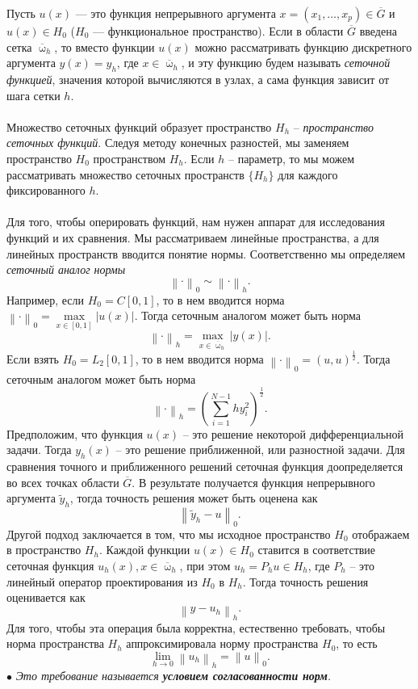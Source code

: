 \documentclass[a4paper, 12pt]{report}
\numberwithin{equation}{section}
\newcommand{\ol}{\overline}
\renewcommand{\omega}{\upomega}
\newcommand\Norm[1]{\left\| #1 \right\|}
\begin{document}
	Пусть $u(x)$ --- это функция непрерывного аргумента $x = (x_1, \ldots, x_p)\in \overline G$ и $u(x) \in H_0$ ($H_0$ --- функциональное пространство). Если в области $\overline G$ введена сетка $\overline \omega_h$, то вместо функции $u(x)$ можно рассматривать функцию дискретного аргумента $y(x) = y_h$, где $x\in \ol \omega _h$, и эту функцию будем называть \textit{сеточной функцией}, значения которой вычисляются в узлах, а сама функция зависит от шага сетки $h$.\\\\
	Множество сеточных функций образует пространство $H_h$ -- \textit{пространство сеточных функций}. Следуя методу конечных разностей, мы заменяем пространство $H_0$ пространством $H_h$. Если $h$ -- параметр, то мы можем рассматривать множество сеточных пространств $\{H_h\}$ для каждого фиксированного $h$.\\\\
	Для того, чтобы оперировать функций, нам нужен аппарат для исследования функций и их сравнения. Мы рассматриваем линейные пространства, а для линейных пространств вводится понятие нормы. Соответственно мы определяем \textit{сеточный аналог нормы} $$\Norm {\cdot}_0 \sim \Norm {\cdot} _h.$$
	Например, если $H_ 0 = C[0,1]$, то в нем вводится норма $\Norm {\cdot}_0 = \underset{x\in [0,1]} {\max}|u(x)|$. Тогда сеточным аналогом может быть норма $$\Norm {\cdot}_h = \underset{x \in \ol \omega_h}{\max}|y(x)|.$$
	Если взять $H_ 0 = L_2[0,1]$, то в нем вводится норма $\Norm {\cdot}_0 = (u,u)^\frac12$. Тогда сеточным аналогом может быть норма $$\Norm {\cdot}_h = \left(\sum_{i=1}^{N-1}hy_i^2\right)^\frac12.$$
	Предположим, что функция $u(x)$ -- это решение некоторой дифференциальной задачи. Тогда $y_h(x)$ -- это решение приближенной, или разностной задачи. Для сравнения точного и приближенного решений сеточная функция доопределяется во всех точках области $\ol G$. В результате получается функция непрерывного аргумента $\widetilde{y}_h$, тогда точность решения может быть оценена как $$\Norm{\widetilde{y}_h - u}_0.$$
	Другой подход заключается в том, что мы исходное пространство $H_0$ отображаем в пространство $H_h$. Каждой функции $u(x)\in H_0$ ставится в соответствие сеточная функция $u_h(x), x \in \ol \omega _h$, при этом $u_h = P_h u \in H_h$, где $P_h$ -- это линейный оператор проектирования из $H_0$ в $H_h$. Тогда точность решения оценивается как $$\Norm{y-u_h}_h.$$ Для того, чтобы эта операция была корректна, естественно требовать, чтобы норма пространства $H_h$ аппроксимировала норму пространства $H_0$, то есть $$\lim\limits_{h\to 0}\Norm{u_h}_h = \Norm{u}_0.$$
	$\bullet$ \textit{Это требование называется \textbf{условием согласованности норм}.}\\\\
\end{document}
